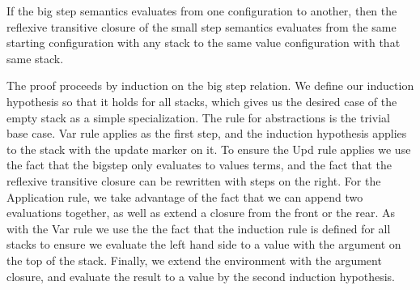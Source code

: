\begin{lemma}
If the big step semantics evaluates from one configuration to another, then the
reflexive transitive closure of the small step semantics evaluates from the same
starting configuration with any stack to the same value configuration with that
same stack.
\end{lemma}
\begin{proofoutline}
The proof proceeds by induction on the big step relation. We define our
induction hypothesis so that it holds for all stacks, which gives us the
desired case of the empty stack as a simple specialization. The rule for
abstractions is the trivial base case. Var rule applies as the first step, and
the induction hypothesis applies to the stack with the update marker on it. To
ensure the Upd rule applies we use the fact that the bigstep only evaluates to
values terms, and the fact that the reflexive transitive closure can be
rewritten with steps on the right. For the Application rule, we take advantage
of the fact that we can append two evaluations together, as well as extend a
closure from the front or the rear. As with the Var rule we use the the fact
that the induction rule is defined for all stacks to ensure we evaluate the left
hand side to a value with the argument on the top of the stack.  Finally, we
extend the environment with the argument closure, and evaluate the result to a
value by the second induction hypothesis.   
\end{proofoutline}


